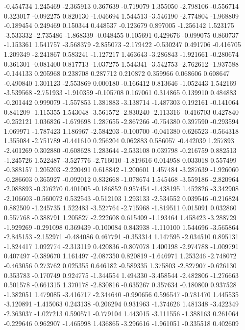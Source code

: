 -0.454734
1.245469
-2.365913
0.367639
-0.719079
1.355050
-2.798106
-0.556714
0.323017
-0.092275
0.820130
-1.046694
1.544513
-3.546190
-2.774804
-1.968809
-0.189454
0.249469
0.150344
0.448537
-0.123679
0.897005
-1.256142
1.523175
-3.533332
-2.735486
-1.868339
-0.048455
0.105691
0.429676
-0.099075
0.860737
-1.153361
1.541757
-3.568379
-2.855073
-2.179422
-0.530247
0.491706
-0.416705
1.209349
-2.241867
0.583241
-1.127217
1.463643
-3.286843
-1.921661
-0.280674
0.361301
-0.081400
0.817713
-1.037275
1.544341
-3.542753
-2.762612
-1.937588
-0.144133
0.205968
0.238708
0.287712
0.210872
0.359966
0.068606
0.608647
-0.490840
1.301123
-2.553869
0.000180
-0.166412
0.813646
-1.052443
1.542169
-3.539568
-2.751933
-1.910359
-0.105708
0.167061
0.314865
0.139910
0.484883
-0.201442
0.999079
-1.557853
1.381883
-3.138714
-1.487303
0.192161
-0.141064
0.841209
-1.115355
1.543048
-3.561572
-2.830240
-2.113316
-0.416703
0.427840
-0.252121
1.036826
-1.679698
1.287655
-2.867266
-0.754380
0.397590
-0.293594
1.069971
-1.787423
1.186967
-2.584203
-0.100700
-0.041380
0.626523
-0.564318
1.355084
-2.751789
-0.441610
0.256204
0.062883
0.586057
-0.442039
1.257893
-2.401269
0.302880
-0.608628
1.283644
-2.533108
0.039798
-0.216759
0.882513
-1.245726
1.522487
-3.527776
-2.716010
-1.819616
0.014958
0.033018
0.557499
-0.388157
1.205203
-2.220491
0.618842
-1.200601
1.457484
-3.287639
-1.926060
-0.286603
0.365927
-0.092012
0.832668
-1.078674
1.545468
-3.559186
-2.820964
-2.088893
-0.376270
0.401005
-0.186852
0.957454
-1.438195
1.452826
-3.342908
-2.106603
-0.560072
0.532543
-0.512103
1.293133
-2.534552
0.039546
-0.216824
0.882509
-1.245735
1.522483
-3.527764
-2.715968
-1.819511
0.015091
0.032860
0.557768
-0.388791
1.205827
-2.222608
0.615409
-1.193464
1.458423
-3.288729
-1.929269
-0.291098
0.369439
-0.100084
0.843938
-1.110100
1.544696
-3.565864
-2.845153
-2.152971
-0.484086
0.467791
-0.353314
1.147595
-2.034510
0.895131
-1.824417
1.092774
-2.313119
0.420836
-0.807078
1.400198
-2.974788
-1.009791
0.407497
-0.389670
1.161497
-2.087350
0.820819
-1.646971
1.253246
-2.748072
-0.463056
0.273762
0.025355
0.646182
-0.589335
1.375803
-2.827907
-0.626130
0.353783
-0.170749
0.924775
-1.344554
1.494330
-3.458544
-2.482806
-1.276663
0.501578
-0.661315
1.370178
-2.830816
-0.635267
0.357634
-0.180800
0.937528
-1.382051
1.479085
-3.416717
-2.344640
-0.990656
0.596547
-0.781470
1.445535
-3.120891
-1.415063
0.243138
-0.206294
0.931963
-1.374626
1.481348
-3.422349
-2.363037
-1.027213
0.590571
-0.779104
1.443015
-3.111556
-1.388163
0.261064
-0.229646
0.962907
-1.465998
1.436865
-3.296616
-1.961051
-0.335518
0.402609
